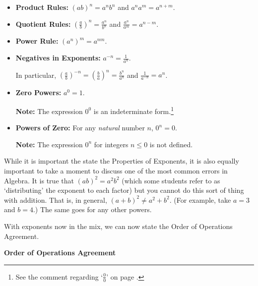\documentclass{ximera}
\begin{document}
\begin{itemize}

\item  \textbf{Product Rules:} $(ab)^{n} = a^n b^n$ and $a^n a^m = a^{n+m}$.

\item  \textbf{Quotient Rules:} $\left(\frac{a}{b}\right)^n = \frac{a^n}{b^n}$ and $\frac{a^n}{a^m} = a^{n-m}$. 

\item \textbf{Power Rule:}  $\left(a^{n}\right)^{m} = a^{nm}$.

\item  \textbf{Negatives in Exponents:}  $a^{-n} = \frac{1}{a^n}$.

 In particular, $\left(\frac{a}{b}\right)^{-n} = \left(\frac{b}{a}\right)^{n} = \frac{b^n}{a^n}$ and $\frac{1}{a^{-n}} = a^{n}$.

\item  \textbf{Zero Powers:}  $a^{0} = 1$.

\textbf{Note:}  The expression $0^{0}$ is an indeterminate form.\footnote{See the comment regarding `$\frac{0}{0}$' on page \pageref{propertiesofzero}.}

\item  \textbf{Powers of Zero:}  For any \textit{natural} number $n$, $0^{n} = 0$.

\textbf{Note:}  The expression $0^{n}$ for integers $n \leq 0$ is not defined.

\end{itemize}


\medskip

While it is important the state the Properties of Exponents, it is also equally important to take a moment to discuss one of the most common errors in Algebra.  It is true that $(ab)^2 = a^2 b^2$ (which some students refer to as `distributing' the exponent to each factor) but you cannot do this sort of thing with addition.  That is, in general,   $(a+b)^2 \neq a^2 + b^2$. (For example, take $a= 3$ and $b = 4$.)  The same goes for any other powers.

\pagebreak

With exponents now in the mix, we can now state the Order of Operations Agreement.

\medskip

\label{orderofoperations}


\centerline{\textbf{Order of Operations Agreement}}
\end{document}
